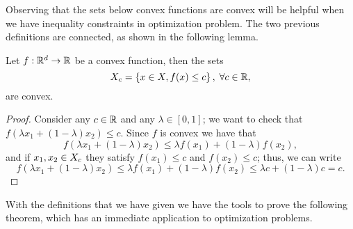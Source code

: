 Observing that the sets below convex functions are convex will be helpful when we have inequality constraints in optimization problem.
The two previous definitions are connected, as shown in the following lemma.
\begin{lemma}
    Let $f: \mathbb{R}^d \to \mathbb{R}$ be a convex function, then the sets
    $$X_c = \left\{x \in X, f(x) \leq c\right\}, \; \forall c \in \mathbb{R}, $$
    are convex.
\end{lemma}
\begin{proof}
    Consider any $c \in \mathbb{R}$ and any $\lambda \in [0, 1]$; we want to check that $f(\lambda x_1 + (1 - \lambda) x_2) \leq c$.
    Since $f$ is convex we have that 
    $$f\left(\lambda x_1 + (1 - \lambda) x_2 \right) \leq \lambda f(x_1) + (1 - \lambda) f(x_2) ,$$
    and if $x_1, x_2 \in X_c$ they satisfy
    $f(x_1) \leq c$ and $f(x_2) \leq c$; thus, we can write 
    $$f\left(\lambda x_1 + (1 - \lambda) x_2 \right) \leq \lambda f(x_1) + (1 - \lambda) f(x_2) \leq \lambda c + (1 - \lambda) c = c.$$
\end{proof}

With the definitions that we have given we have the tools to prove the following theorem, which has an immediate application to optimization problems.

